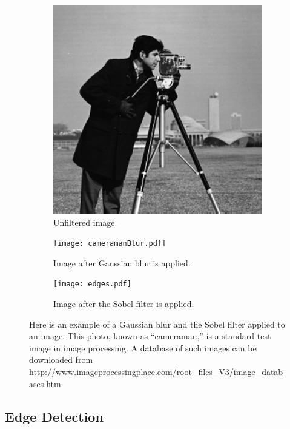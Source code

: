 \begin{figure}
\centering
\begin{subfigure}[b]{.49\textwidth}
\centering
\includegraphics[width=\textwidth]{cameraman.png}
\caption{Unfiltered image.}
\label{fig:cameraman}
\end{subfigure}
\begin{subfigure}[b]{.49\textwidth}
\centering
\texttt{[image: cameramanBlur.pdf]}
\caption{Image after Gaussian blur is applied.}
\label{fig:cameraman_blur}
\end{subfigure}
\begin{subfigure}[b]{.49\textwidth}
\centering
\texttt{[image: edges.pdf]}
\caption{Image after the Sobel filter is applied.}
\label{fig:cameraman_edges}
\end{subfigure}
\caption{Here is an example of a Gaussian blur and the Sobel filter applied to an image. 
This photo, known as ``cameraman,'' is a standard test image in image processing. 
A database of such images can be downloaded from \url{http://www.imageprocessingplace.com/root_files_V3/image_databases.htm}.}
\label{fig:cameraman1}
\end{figure}



\subsection*{Edge Detection}

